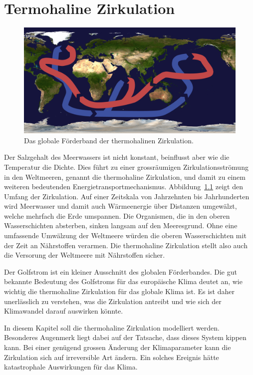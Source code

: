 %
%
%
\chapter{Termohaline Zirkulation\label{chapter:thc}}
\begin{figure}
\centering
\includegraphics[width=\hsize]{chapters/4/1280px-Thermohaline_circulation.png}
\caption{
Das globale Förderband der thermohalinen Zirkulation.
\label{skript:thc:foerderband}}
\end{figure}%
Der Salzgehalt des Meerwassers ist nicht konstant, beinflusst aber
wie die Temperatur die Dichte.
Dies führt zu einer grossräumigen Zirkulationsströmung in den Weltmeeren,
genannt die thermohaline Zirkulation,
und damit zu einem weiteren bedeutenden Energietransportmechanismus.
Abbildung~\ref{skript:thc:foerderband} zeigt den Umfang der Zirkulation.
Auf einer Zeitskala von Jahrzehnten bis Jahrhunderten wird Meerwasser 
und damit auch Wärmeenergie über Distanzen umgewälzt, welche mehrfach die
Erde umspannen.
Die Organismen, die in den oberen Wasserschichten absterben, sinken langsam
auf den Meeresgrund.
Ohne eine umfassende Umwälzung der Weltmeere würden die oberen Wasserschichten
mit der Zeit an Nährstoffen verarmen.
Die thermohaline Zirkulation stellt also auch die Versorung der
Weltmeere mit Nährstoffen sicher.

Der Golfstrom ist ein kleiner Ausschnitt des globalen Förderbandes.
Die gut bekannte Bedeutung des Golfstroms für das europäische Klima 
deutet an, wie wichtig die thermohaline Zirkulation für das globale
Klima ist.
Es ist daher unerlässlich zu verstehen, was die Zirkulation antreibt und
wie sich der Klimawandel darauf auswirken könnte.

In diesem Kapitel soll die thermohaline Zirkulation modelliert werden.
Besonderes Augenmerk liegt dabei auf der Tatsache, dass dieses System
kippen kann.
Bei einer genügend grossen Änderung der Klimaparameter kann die Zirkulation
sich auf irreversible Art ändern.
Ein solches Ereignis hätte katastrophale Auswirkungen für das Klima.







